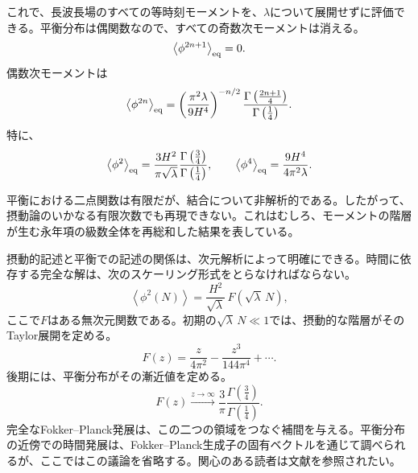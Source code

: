 \documentclass[a4paper,11pt,oneside]{article}
\theoremstyle{definition}
\numberwithin{equation}{section}
\begin{document}
これで、長波長場のすべての等時刻モーメントを、\(\lambda\)について展開せずに評価できる。平衡分布は偶関数なので、すべての奇数次モーメントは消える。
\begin{equation}
\left\langle
\phi^{2n+1}
\right\rangle_{\rm eq}
=
0.
\end{equation}
偶数次モーメントは
\begin{equation}
\left\langle
\phi^{2n}
\right\rangle_{\rm eq}
=
\left( \frac{\pi^{2}\lambda}{9H^{4}} \right)^{-n/2}
\frac{
\Gamma\left(
\frac{2n+1}{4}
\right)
}{
\Gamma\left(
\frac{1}{4}
\right)
}.
\label{quarticequilibriummoments}
\end{equation}
特に、
\begin{equation}
\left\langle
\phi^{2}
\right\rangle_{\rm eq}
=
\frac{3H^{2}}{\pi\sqrt{\lambda}}
\frac{
\Gamma\left(
\frac{3}{4}
\right)
}{
\Gamma\left(
\frac{1}{4}
\right)
},
\label{quarticequilibriumtwopoint} \qquad 
\left\langle
\phi^{4}
\right\rangle_{\rm eq}
=
\frac{9H^{4}}{4\pi^{2}\lambda}.
\end{equation}


平衡における二点関数は有限だが、結合について非解析的である。したがって、摂動論のいかなる有限次数でも再現できない。これはむしろ、モーメントの階層が生む永年項の級数全体を再総和した結果を表している。



摂動的記述と平衡での記述の関係は、次元解析によって明確にできる。時間に依存する完全な解は、次のスケーリング形式をとらなければならない。
\begin{equation}
\left\langle
\phi^{2}(N)
\right\rangle
=
\frac{H^{2}}{\sqrt{\lambda}}\,
F\left(
\sqrt{\lambda}\,N
\right),
\label{quarticscalingform}
\end{equation}
ここで\(F\)はある無次元関数である。初期の\(\sqrt{\lambda}\,N\ll1\)では、摂動的な階層がそのTaylor展開を定める。
\begin{equation}
F(z)
=
\frac{z}{4\pi^{2}}
-
\frac{z^{3}}{144\pi^{4}}
+
\cdots.
\end{equation}
後期には、平衡分布がその漸近値を定める。
\begin{equation}
F(z)
\xrightarrow{z\rightarrow\infty}
\frac{3}{\pi}
\frac{
\Gamma\left(
\frac{3}{4}
\right)
}{
\Gamma\left(
\frac{1}{4}
\right)
}.
\end{equation}
完全なFokker--Planck発展は、この二つの領域をつなぐ補間を与える。平衡分布の近傍での時間発展は、Fokker--Planck生成子の固有ベクトルを通じて調べられるが、ここではこの議論を省略する。関心のある読者は文献を参照されたい。
\end{document}
